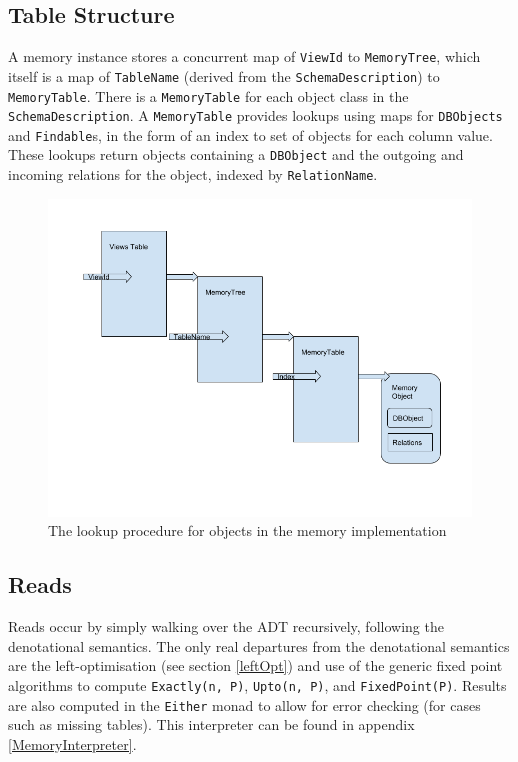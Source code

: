 \documentclass[12pt,a4paper,twoside,openright]{report}
\newcommand\codeName[1]{\texttt{#1}}
\begin{document}
	\subsection{Table Structure}
	A memory instance stores a concurrent map of \codeName{ViewId} to \codeName{MemoryTree}, which itself is a map of \codeName{TableName} (derived from the \codeName{SchemaDescription}) to \codeName{MemoryTable}. There is a \codeName{MemoryTable} for each object class in the \codeName{SchemaDescription}. A \codeName{MemoryTable} provides lookups using maps for \codeName{DBObjects} and \codeName{Findable}s, in the form of an index to set of objects for each column value. These lookups return objects containing a \codeName{DBObject} and the outgoing and incoming relations for the object, indexed by \codeName{RelationName}. 

\begin{figure}[ht]
\centering
  \includegraphics[width=\textwidth]{figs/MemoryHierarchy.png}
  \caption{The lookup procedure for objects in the memory implementation}
  \label{fig:MemoryHierarchy}
\end{figure}

	
	\subsection{Reads}
Reads occur by simply walking over the ADT recursively, following the denotational semantics. The only real departures from the denotational semantics are the left-optimisation (see section \ref{leftOpt}) and use of the generic fixed point algorithms to compute \codeName{Exactly(n, P)}, \codeName{Upto(n, P)}, and \codeName{FixedPoint(P)}. Results are also computed in the \codeName{Either} monad to allow for error checking (for cases such as missing tables). This interpreter can be found in appendix \ref{MemoryInterpreter}.
	
\end{document}

